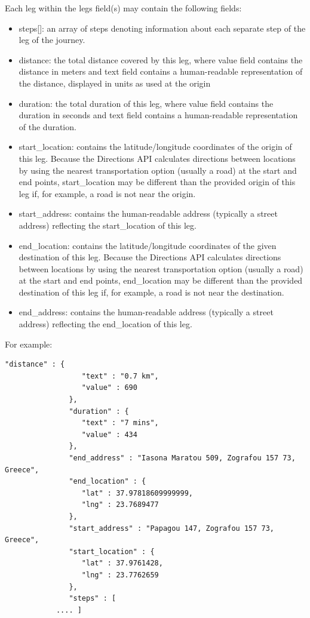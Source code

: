 Each leg within the legs field(s) may contain the following fields:

\begin{itemize}
 \item steps[]: an array of steps denoting information about each separate step of the leg of the journey.
 \item distance: the total distance covered by this leg, where value field contains the distance in meters and text field contains a human-readable representation of 
 the distance, displayed in units as used at the origin
 \item duration: the total duration of this leg, where value field contains the duration in seconds and text field contains a human-readable representation of the duration.
 \item start\_location: contains the latitude/longitude coordinates of the origin of this leg. Because the Directions API calculates directions between locations 
 by using the nearest transportation option (usually a road) at the start and end points, start\_location may be different than the provided origin of this leg 
 if, for example, a road is not near the origin.
 \item start\_address: contains the human-readable address (typically a street address) reflecting the start\_location of this leg.
 \item end\_location: contains the latitude/longitude coordinates of the given destination of this leg. Because the Directions API calculates directions 
 between locations by using the nearest transportation option (usually a road) at the start and end points, end\_location may be different than the provided 
 destination of this leg if, for example, a road is not near the destination.
 \item end\_address: contains the human-readable address (typically a street address) reflecting the end\_location of this leg.
\end{itemize}

For example:

\begin{lstlisting}[basicstyle=\footnotesize\ttfamily, breaklines=true]
	      "distance" : {
                  "text" : "0.7 km",
                  "value" : 690
               },
               "duration" : {
                  "text" : "7 mins",
                  "value" : 434
               },
               "end_address" : "Iasona Maratou 509, Zografou 157 73, Greece",
               "end_location" : {
                  "lat" : 37.97818609999999,
                  "lng" : 23.7689477
               },
               "start_address" : "Papagou 147, Zografou 157 73, Greece",
               "start_location" : {
                  "lat" : 37.9761428,
                  "lng" : 23.7762659
               },
               "steps" : [
		    .... ]
\end{lstlisting}


